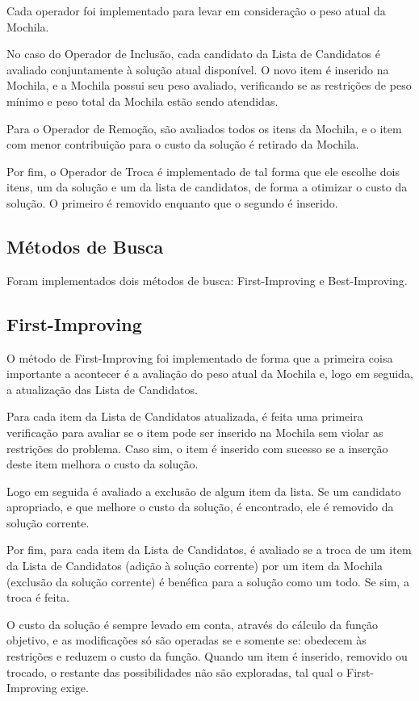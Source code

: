 \documentclass{article}
\theoremstyle{definition}
\begin{document}
Cada operador foi implementado para levar em consideração o peso atual da Mochila.

No caso do Operador de Inclusão, cada candidato da Lista de Candidatos é avaliado conjuntamente à solução atual disponível. O novo item é inserido na Mochila, e a Mochila possui seu peso avaliado, verificando se as restrições de peso mínimo e peso total da Mochila estão sendo atendidas.

Para o Operador de Remoção, são avaliados todos os itens da Mochila, e o item com menor contribuição para o custo da solução é retirado da Mochila.

Por fim, o Operador de Troca é implementado de tal forma que ele escolhe dois itens, um da solução e um da lista de candidatos, de forma a otimizar o custo da solução. O primeiro é removido enquanto que o segundo é inserido.

\subsection{Métodos de Busca}
Foram implementados dois métodos de busca: First-Improving e Best-Improving.

\subsection{First-Improving}

O método de First-Improving foi implementado de forma que a primeira coisa importante a acontecer é a avaliação do peso atual da Mochila e, logo em seguida, a atualização das Lista de Candidatos.

Para cada item da Lista de Candidatos atualizada, é feita uma primeira verificação para avaliar se o item pode ser inserido na Mochila sem violar as restrições do problema. Caso sim, o item é inserido com sucesso se a inserção deste item melhora o custo da solução.

Logo em seguida é avaliado a exclusão de algum item da lista. Se um candidato apropriado, e que melhore o custo da solução, é encontrado, ele é removido da solução corrente.

Por fim, para cada item da Lista de Candidatos, é avaliado se a troca de um item da Lista de Candidatos (adição à solução corrente) por um item da Mochila (exclusão da solução corrente) é benéfica para a solução como um todo. Se sim, a troca é feita.

O custo da solução é sempre levado em conta, através do cálculo da função objetivo, e as modificações só são operadas se e somente se: obedecem às restrições e reduzem o custo da função. Quando um item é inserido, removido ou trocado, o restante das possibilidades não são exploradas, tal qual o First-Improving exige.
\end{document}

